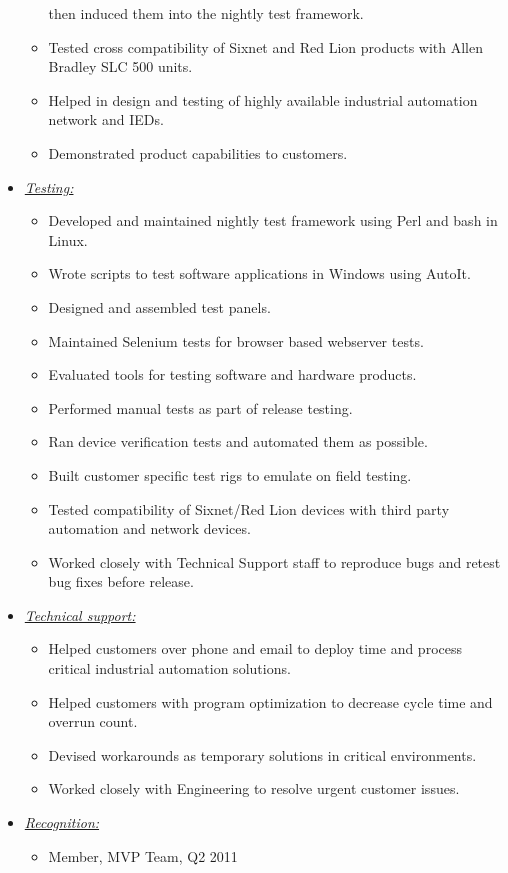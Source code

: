 \documentclass{article}
\begin{document}
\begin{itemize}
\begin{itemize}
                then induced them into the nightly test framework.
          \item Tested cross compatibility of Sixnet and Red Lion products with
                Allen Bradley SLC 500 units.
          \item Helped in design and testing of highly available industrial
                automation network and IEDs.
          \item Demonstrated product capabilities to customers.
          \end{itemize}
    \item \underline{\it Testing:}
          \begin{itemize}
          \item Developed and maintained nightly test framework using Perl
                and bash in Linux.
          \item Wrote scripts to test software applications in Windows using
                AutoIt.
          \item Designed and assembled test panels.
          \item Maintained Selenium tests for browser based webserver tests.
          \item Evaluated tools for testing software and hardware products.
          \item Performed manual tests as part of release testing.
          \item Ran device verification tests and automated them as possible.
          \item Built customer specific test rigs to emulate on field testing.
          \item Tested compatibility of Sixnet/Red Lion devices with third
                party automation and network devices.
          \item Worked closely with Technical Support staff to reproduce bugs
                and retest bug fixes before release.
          \end{itemize}
    \item \underline{\it Technical support:}
          \begin{itemize}
          \item Helped customers over phone and email to deploy time and process
                critical industrial automation solutions.
          \item Helped customers with program optimization to decrease cycle
                time and overrun count.
          \item Devised workarounds as temporary solutions in critical
                environments.
          \item Worked closely with Engineering to resolve urgent customer
                issues.
          \end{itemize}
    \item \underline{\it Recognition:}
          \begin{itemize}
          \item Member, MVP Team, Q2 2011
          \end{itemize}
    \end{itemize}
    \bigskip
\end{document}
